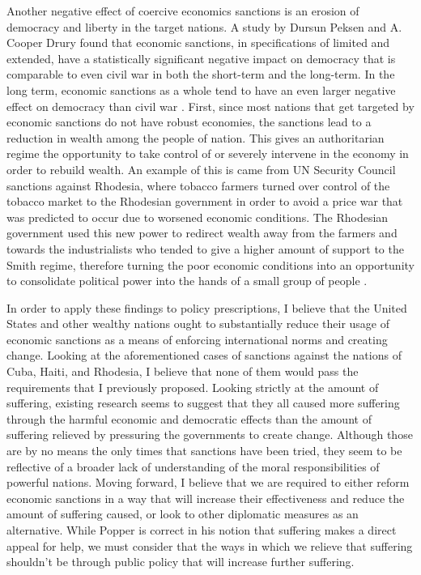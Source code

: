 \documentclass[12pt]{article}
\begin{document}
Another negative effect of coercive economics sanctions is an erosion of democracy and liberty in the target nations.
A study by Dursun Peksen and A. Cooper Drury found that economic sanctions, in specifications of limited and extended, have a statistically significant negative impact on democracy that is comparable to even civil war in both the short-term and the long-term.
In the long term, economic sanctions as a whole tend to have an even larger negative effect on democracy than civil war \autocite[255, 257]{peksen2010}.
First, since most nations that get targeted by economic sanctions do not have robust economies, the sanctions lead to a reduction in wealth among the people of nation.
This gives an authoritarian regime the opportunity to take control of or severely intervene in the economy in order to rebuild wealth.
An example of this is came from UN Security Council sanctions against Rhodesia, where tobacco farmers turned over control of the tobacco market to the Rhodesian government in order to avoid a price war that was predicted to occur due to worsened economic conditions.
The Rhodesian government used this new power to redirect wealth away from the farmers and towards the industrialists who tended to give a higher amount of support to the Smith regime, therefore turning the poor economic conditions into an opportunity to consolidate political power into the hands of a small group of people \autocite[244]{peksen2010}.

In order to apply these findings to policy prescriptions, I believe that the United States and other wealthy nations ought to substantially reduce their usage of economic sanctions as a means of enforcing international norms and creating change.
Looking at the aforementioned cases of sanctions against the nations of Cuba, Haiti, and Rhodesia, I believe that none of them would pass the requirements that I previously proposed.
Looking strictly at the amount of suffering, existing research seems to suggest that they all caused more suffering through the harmful economic and democratic effects than the amount of suffering relieved by pressuring the governments to create change.
Although those are by no means the only times that sanctions have been tried, they seem to be reflective of a broader lack of understanding of the moral responsibilities of powerful nations.
Moving forward, I believe that we are required to either reform economic sanctions in a way that will increase their effectiveness and reduce the amount of suffering caused, or look to other diplomatic measures as an alternative.
While Popper is correct in his notion that suffering makes a direct appeal for help, we must consider that the ways in which we relieve that suffering shouldn't be through public policy that will increase further suffering.

\newpage
\printbibliography{}
\end{document}
